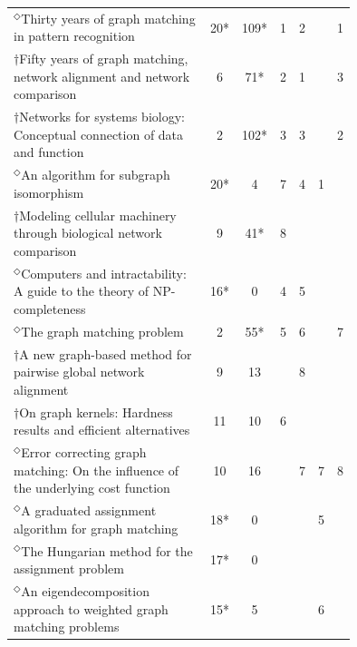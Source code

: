 \documentclass[12pt]{thesis}
\theoremstyle{plain}
\theoremstyle{definition}
\theoremstyle{remark}
\begin{document}
\begin{table}[H]
\centering
\vspace{-.5cm}
{\setlength\extrarowheight{2pt}\setlength{\tabcolsep}{3pt}\fontsize{10}{13}\selectfont
\begin{tabular}{|L{0.75\linewidth}|c|c|c|c|c|c|}
\hline
&  &   &  &   &   &  \\ 
\hline\hline
$^\Diamond$Thirty years of graph matching in pattern recognition  \cite{Conte_2004} & 20* & 109* & 1 & 2 &  & 1 \\ \hline
$\dagger$Fifty years of graph matching, network alignment and network comparison  \cite{Emmert_Streib_2016} & 6 & 71* & 2 & 1 &  & 3 \\ \hline
$\dagger$Networks for systems biology: Conceptual connection of data and function  \cite{Emmert_Streib_2011} & 2 & 102* & 3 & 3 &  & 2 \\ \hline
$^\Diamond$An algorithm for subgraph isomorphism  \cite{Ullmann_1976} & 20* & 4 & 7 & 4 & 1 &  \\ \hline
$\dagger$Modeling cellular machinery through biological network comparison  \cite{Sharan_2006} & 9 & 41* & 8 &  &  &  \\ \hline
$^\Diamond$Computers and intractability: A guide to the theory of NP-completeness  \cite{Hartmanis_1982} & 16* & 0 & 4 & 5 &  &  \\ \hline
$^\Diamond$The graph matching problem  \cite{Livi_2012} & 2 & 55* & 5 & 6 &  & 7 \\ \hline
$\dagger$A new graph-based method for pairwise global network alignment  \cite{Klau_2009} & 9 & 13 &  & 8 &  &  \\ \hline
$\dagger$On graph kernels: Hardness results and efficient alternatives  \cite{Gartner_2003} & 11 & 10 & 6 &  &  &  \\ \hline
$^\Diamond$Error correcting graph matching: On the influence of the underlying cost function  \cite{Bunke_1999} & 10 & 16 &  & 7 & 7 & 8 \\ \hline
$^\Diamond$A graduated assignment algorithm for graph matching  \cite{Gold_1996} & 18* & 0 &  &  & 5 &  \\ \hline
$^\Diamond$The Hungarian method for the assignment problem  \cite{Kuhn_1955} & 17* & 0 &  &  &  &  \\ \hline
$^\Diamond$An eigendecomposition approach to weighted graph matching problems  \cite{Umeyama_1988} & 15* & 5 &  &  & 6 &  \\ \hline

\end{tabular}}
\end{table}
\end{document}
